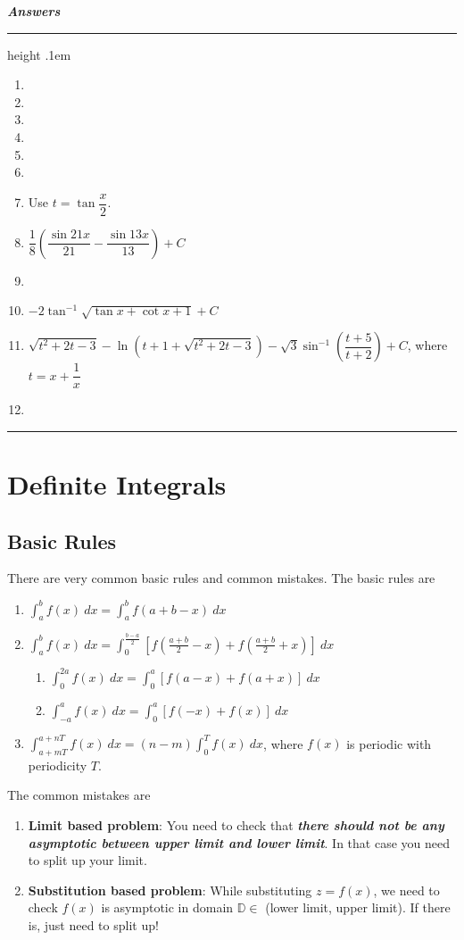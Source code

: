 \documentclass[12pt,a4paper,twoside]{book}
\newcommand{\dint}[1]{\displaystyle{\int #1 \  dx}}
\newcommand{\answer}[1]{\textit{\textbf{Answers}} \vhrulefill{.1em}
\ \\[2pt]
#1
\vspace{5pt}\hrule height .1em }
\def\vhrulefill#1{\leaders\hrule height #1\hfill}
\begin{document}
\answer{
\begin{enumerate}
\item 
\item 
\item 
\item
\item 
\item 
\item Use $t=\tan{\dfrac{x}{2}}$.
\item $\dfrac{1}{8}\left( \dfrac{\sin{21x}}{21}-\dfrac{\sin{13x}}{13}\right)+C$
\item 
\item $-2\tan^{-1}{\sqrt{\tan x+\cot x +1}}+C$
\item $\sqrt{t^2+2t-3}-\ln{(t+1+\sqrt{t^2+2t-3})}-\sqrt{3}\sin^{-1}{\left(\dfrac{t+5}{t+2}\right)}+C$, where $t=x+\dfrac{1}{x}$
\item 

\end{enumerate}
  
}

\chapter{Definite Integrals}

\section{Basic Rules}
There are very common basic rules and common mistakes. The basic rules are
\begin{tcolorbox}[halign=center]

\begin{enumerate}
\item $\dint{_a^b f(x)}=\dint{_a^bf(a+b-x)}$
\item $\dint{_a^bf(x)}=\dint{_0^{\frac{b-a}{2}}[f(\frac{a+b}{2}-x)+ f(\frac{a+b}{2}+x)]}$
	\begin{enumerate}
	\item $\dint{_0^{2a}f(x)}=\dint{_0^{a}[f(a-x)+ f(a+x)]}$
	\item $\dint{_{-a}^af(x)}=\dint{_0^{a}[f(-x)+ f(x)]}$
	\end{enumerate}
\item $\dint{_{a+mT}^{a+nT}f(x)}=(n-m)\dint{_{0}^{T}f(x)} $, where $f(x)$ is periodic with periodicity $T$.
\end{enumerate}
\end{tcolorbox}
The common mistakes are 
\begin{enumerate}
\item \textbf{Limit based problem}: You need to check that \textit{\textbf{there should not be any asymptotic between upper limit and lower limit}}. In that case you need to split up your limit.
\item \textbf{Substitution based problem}: While substituting $z=f(x)$, we need to check $f(x)$ is asymptotic in domain $\mathbb{D} \in$ (lower limit, upper limit). If there is, just need to split up!
\end{enumerate}
\end{document}
